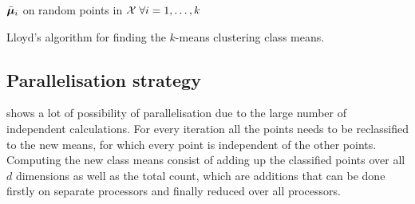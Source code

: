 \begin{algorithm}[!ht]


  \BlankLine
  \BlankLine

  \Init $\bar{\bm{\mu}}_i$ on random points in $\mathcal{X} \; \forall i = 1, \ldots, k$ \;
  

  \caption{Lloyd's algorithm for finding the $k$-means clustering class means.}
  \label{alg:lloyds}

\end{algorithm}

\subsection{Parallelisation strategy}

\newcommand{\Titer}{T_{\text{iter}}}
\newcommand{\tcalc}{t_{\text{calc}}}
\newcommand{\tcomm}{t_{\text{comm}}}

 shows a lot of possibility of parallelisation
due to the large number of independent calculations.
For every iteration all the points needs to be reclassified to the new means,
for which every point is independent of the other points.
Computing the new class means consist of adding up the classified points over all $d$ dimensions
as well as the total count,
which are additions that can be done firstly on separate processors and finally reduced over all processors.


